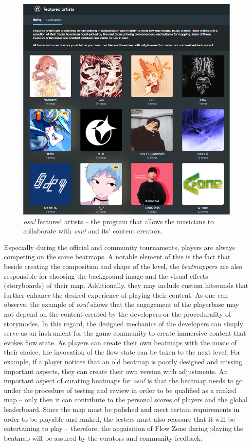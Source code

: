 \begin{figure}[h]
    \centering\includegraphics[scale=0.4]{obrazki/featuredartists.png}
    \caption{\textit{osu!} featured artists -- the program that allows the musicians to collaborate with \textit{osu!} and its' content creators. \cite{osufeatured}}
    \label{fig:osufeatured}
\end{figure}

Especially during the official and community tournaments, players are always competing on the same beatmaps. A notable element of this is the fact that beside creating the composition and shape of the level, the \textit{beatmappers} are also responsible for choosing the background image and the visual effects (storyboards) of their map. Additionally, they may include custom hitsounds that further enhance the desired experience of playing their content. As one can observe, the example of \textit{osu!} shows that the engagement of the playerbase may not depend on the content created by the developers or the procedurality of storymodes. In this regard, the designed mechanics of the developers can simply serve as an instrument for the game community to create immersive content that evokes flow state. As players can create their own beatmaps with the music of their choice, the invocation of the flow state can be taken to the next level. For example, if a player notices that an old beatmap is poorly designed and missing important aspects, they can create their own version with adjustments. An important aspect of curating beatmaps for \textit{osu!} is that the beatmap needs to go under the procedure of testing and review in order to be qualified as a ranked map -- only then it can contribute to the personal scores of players and the global leaderboard. Since the map must be polished and meet certain requirements in order to be playable and ranked, the testers must also reassure that it will be entertaining to play -- therefore, the acquisition of Flow Zone during playing the beatmap will be assured by the curators and community feedback. 


